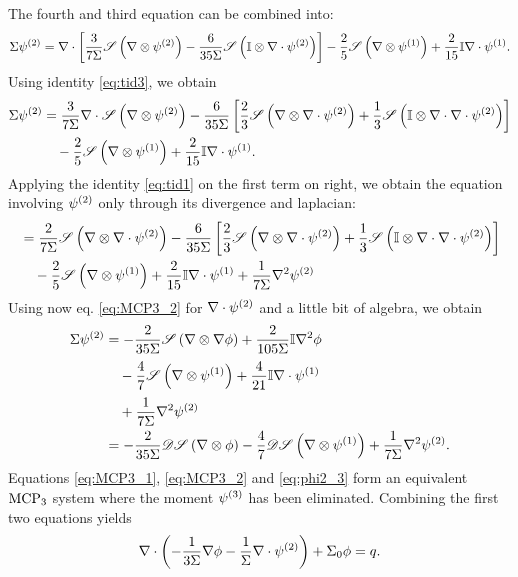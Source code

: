 The fourth and third equation can be combined into:
$$
	\Sigma\fmom[2] = \div\left[\frac{3}{7\Sigma}\Sym{\del\otimes\fmom[2]} -
	\frac{6}{35\Sigma}\Sym{\eye\otimes\div\fmom[2]}\right] - \frac{2}{5}\Sym{\del\otimes\fmom[1]} +
	\frac{2}{15}\eye\del\cdot\fmom[1].
$$
Using identity \eqref{eq:tid3}, we obtain
\begin{equation*}\label{eq:phi2_1}
\begin{aligned}
	\Sigma\fmom[2] &= \frac{3}{7\Sigma}\div\Sym{\del\otimes\fmom[2]} -
	\frac{6}{35\Sigma}\left[\frac23\Sym{\del\otimes\div\fmom[2]} + \frac13\Sym{\eye\otimes\div\div\fmom[2]}\right]\\
	&\quad - \frac{2}{5}\Sym{\del\otimes\fmom[1]} + \frac{2}{15}\eye\del\cdot\fmom[1].
\end{aligned}
\end{equation*}
Applying the identity \eqref{eq:tid1} on the first term on right, we obtain the equation involving $\fmom[2]$ only
through its divergence and laplacian:
\begin{equation*}\label{eq:phi2_2}
\begin{aligned}
	&= \frac{2}{7\Sigma}\Sym{\del\otimes\div\fmom[2]} -
	\frac{6}{35\Sigma}\left[\frac23\Sym{\del\otimes\div\fmom[2]} + \frac13\Sym{\eye\otimes\div\div\fmom[2]}\right]\\
	&\quad - \frac{2}{5}\Sym{\del\otimes\fmom[1]} + \frac{2}{15}\eye\del\cdot\fmom[1] + \frac{1}{7\Sigma}\lap\fmom[2]
\end{aligned}
\end{equation*}
Using now eq. \eqref{eq:MCP3_2} for $\div\fmom[2]$ and a little bit of algebra, we obtain
\begin{equation}\label{eq:phi2_3}
\begin{aligned}
	\Sigma\fmom[2] &= -\frac{2}{35\Sigma}\Sym{\del\otimes\del\phi} + \frac{2}{105\Sigma}\eye\lap\phi\\[.2em]
	&\quad - \frac{4}{7}\Sym{\del\otimes\fmom[1]} + \frac{4}{21}\eye\div\fmom[1]\\[.2em]
	&\quad + \frac{1}{7\Sigma}\lap\fmom[2]\\
	&= -\frac{2}{35\Sigma}\detr[2]\Sym{\del\otimes\phi} - \frac{4}{7}\detr[2]\Sym{\del\otimes\fmom[1]} +
	\frac{1}{7\Sigma}\lap\fmom[2].
\end{aligned}	
\end{equation}
Equations \eqref{eq:MCP3_1}, \eqref{eq:MCP3_2} and \eqref{eq:phi2_3} form an equivalent $\MCPN[3]$ system where the
moment $\fmom[3]$ has been eliminated. Combining the first two equations yields
$$
	\div\left(-\frac{1}{3\Sigma}\del\phi - \frac{1}{\Sigma}\div\fmom[2]\right) + \Sigma_0\phi = q.
$$
